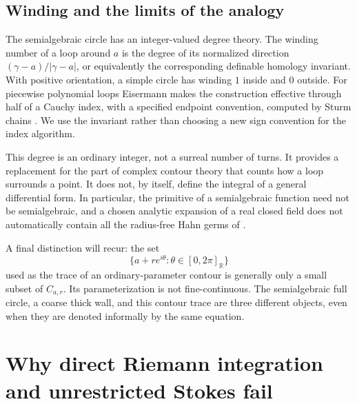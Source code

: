 \documentclass[11pt,letterpaper]{article}
\theoremstyle{definition}
\theoremstyle{remark}
\newcommand{\R}{\mathbb R}\newcommand{\C}{\mathbb C}\newcommand{\Q}{\mathbb Q}
\numberwithin{equation}{section}
\begin{document}
\subsection{Winding and the limits of the analogy}
The semialgebraic circle has an integer-valued degree theory. The winding number of a loop around $a$ is the degree of its normalized direction $(\gamma-a)/|\gamma-a|$, or equivalently the corresponding definable homology invariant. With positive orientation, a simple circle has winding $1$ inside and $0$ outside. For piecewise polynomial loops Eisermann makes the construction effective through half of a Cauchy index, with a specified endpoint convention, computed by Sturm chains \cite[Theorem~1.2]{Eisermann}. We use the invariant rather than choosing a new sign convention for the index algorithm.

This degree is an ordinary integer, not a surreal number of turns. It provides a replacement for the part of complex contour theory that counts how a loop surrounds a point. It does not, by itself, define the integral of a general differential form. In particular, the primitive of a semialgebraic function need not be semialgebraic, and a chosen analytic expansion of a real closed field does not automatically contain all the radius-free Hahn germs of \cite{Geometry}.

A final distinction will recur: the set
\[
 \{a+re^{i\theta}:\theta\in[0,2\pi]_{\R}\}
\]
used as the trace of an ordinary-parameter contour is generally only a small subset of $C_{a,r}$. Its parameterization is not fine-continuous. The semialgebraic full circle, a coarse thick wall, and this contour trace are three different objects, even when they are denoted informally by the same equation.

\section{Why direct Riemann integration and unrestricted Stokes fail}\label{sec:obstructions}
\end{document}
